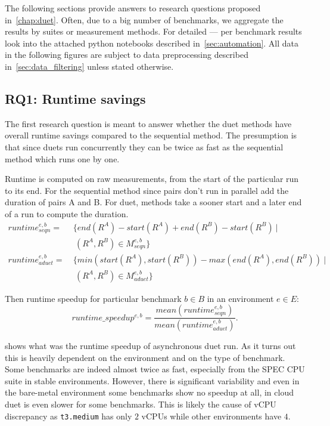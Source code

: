The following sections provide answers to research questions proposed in~\cref{chap:duet}.
Often, due to a big number of benchmarks, we aggregate the results by suites or measurement methods.
For detailed --- per benchmark results look into the attached python notebooks described in~\cref{sec:automation}.
All data in the following figures are subject to data preprocessing described in~\cref{sec:data_filtering} unless stated otherwise.

\subsection{RQ1: Runtime savings}
\label{sec:rq1}

The first research question is meant to answer whether the duet methods have overall runtime savings compared to the sequential method.
The presumption is that since duets run concurrently they can be twice as fast as the sequential method which runs one by one.

Runtime is computed on raw measurements, from the start of the particular run to its end. For the sequential method since pairs don't run in parallel add the duration of pairs A and B.
For duet, methods take a sooner start and a later end of a run to compute the duration.
\begin{align*}
runtime^{e, b}_{seqn}  =&~\{end(R^A) - start(R^A) + end(R^B) - start(R^B)~|\\
                        &~~(R^A, R^B) \in M^{e, b}_{seqn}\} \\
runtime^{e, b}_{aduet} =&~\{min(start(R^A), start(R^B)) - max(end(R^A), end(R^B))~|\\
                        &~~(R^A, R^B) \in M^{e, b}_{aduet}\}
\end{align*}

Then runtime speedup for particular benchmark $b \in B$ in an environment $e \in E$:
\begin{equation}\label{eq:runtimespeedup}
runtime\_speedup^{e, b} = \frac{mean(runtime^{e, b}_{seqn})}{mean(runtime^{e, b}_{aduet})}.
\end{equation}

 shows what was the runtime speedup of asynchronous duet run.
As it turns out this is heavily dependent on the environment and on the type of benchmark.
Some benchmarks are indeed almost twice as fast, especially from the SPEC CPU suite in stable environments.
However, there is significant variability and even in the \mbox{bare-metal} environment some benchmarks show no speedup at all, in cloud duet is even slower for some benchmarks.
This is likely the cause of vCPU discrepancy as \lstinline{t3.medium} has only $2$ vCPUs while other environments have $4$.

